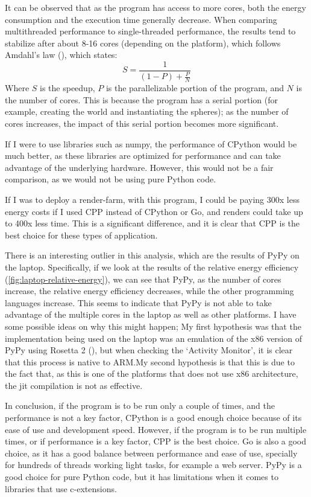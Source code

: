It can be observed that as the program has access to more cores, both the energy consumption and the execution time generally decrease. When comparing multithreaded performance to single-threaded performance, the results tend to stabilize after about 8-16 cores (depending on the platform), which follows Amdahl's law (\cite{amdahl:law}), which states:
$$
S = \frac{1}{(1 - P) + \frac{P}{N}}
$$
Where $S$ is the speedup, $P$ is the parallelizable portion of the program, and $N$ is the number of cores. This is because the program has a serial portion (for example, creating the world and instantiating the spheres); as the number of cores increases, the impact of this serial portion becomes more significant.

If I were to use libraries such as \Gls{numpy}, the performance of \gls{CPython} would be much better, as these libraries are optimized for performance and can take advantage of the underlying hardware. However, this would not be a fair comparison, as we would not be using pure Python code.

If I was to deploy a render-farm, with this program, I could be paying 300x less energy costs if I used \gls{CPP} instead of \gls{CPython} or Go, and renders could take up to 400x less time. This is a significant difference, and it is clear that \gls{CPP} is the best choice for these types of application.

There is an interesting outlier in this analysis, which are the results of PyPy on the laptop. Specifically, if we look at the results of the relative energy efficiency (\autoref{fig:laptop-relative-energy}), we can see that PyPy, as the number of cores increase, the relative energy efficiency decreases, while the other programming languages increase. This seems to indicate that PyPy is not able to take advantage of the multiple cores in the laptop as well as other platforms. I have some possible ideas on why this might happen; My first hypothesis was that the implementation being used on the laptop was an emulation of the x86 version of PyPy using Rosetta 2 (\cite{apple:rosetta2}), but when checking the `Activity Monitor', it is clear that this process is native to \gls{ARM}.\@ My second hypothesis is that this is due to the fact that, as this is one of the platforms that does not use x86 architecture, the \gls{jit} compilation is not as effective.


In conclusion, if the program is to be run only a couple of times, and the performance is not a key factor, \gls{CPython} is a good enough choice because of its ease of use and development speed. However, if the program is to be run multiple times, or if performance is a key factor, \gls{CPP} is the best choice. Go is also a good choice, as it has a good balance between performance and ease of use, specially for hundreds of threads working light tasks, for example a web server. PyPy is a good choice for pure Python code, but it has limitations when it comes to libraries that use \glspl{c-extension}.

